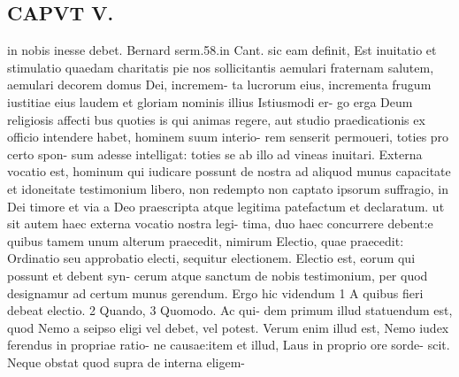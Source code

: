 \documentclass{article}
\begin{document}
\begin{pages}
\section*{CAPVT V. }
\marginpar{[ p.345 ]}in nobis inesse debet. Bernard serm.58.in Cant. sic eam definit, Est inuitatio et stimulatio quaedam charitatis pie nos sollicitantis aemulari fraternam salutem, aemulari decorem domus Dei, incremem- ta lucrorum eius, incrementa frugum iustitiae eius laudem et gloriam nominis illius Istiusmodi er- go erga Deum religiosis affecti bus quoties is qui animas regere, aut studio praedicationis ex officio intendere habet, hominem suum interio- rem senserit permoueri, toties pro certo spon- sum adesse intelligat: toties se ab illo ad vineas inuitari. Externa vocatio est, hominum qui iudicare possunt de nostra ad aliquod munus capacitate et idoneitate testimonium libero, non redempto non captato ipsorum suffragio, in Dei timore et via a Deo praescripta atque legitima patefactum et declaratum. ut sit autem haec externa vocatio nostra legi- tima, duo haec concurrere debent:e quibus tamem unum alterum praecedit, nimirum Electio, quae praecedit: Ordinatio seu approbatio electi, sequitur electionem. Electio est, eorum qui possunt et debent syn- cerum atque sanctum de nobis testimonium, per quod designamur ad certum munus gerendum. Ergo hic videndum 1 A quibus fieri debeat electio. 2 Quando, 3 Quomodo. Ac qui- dem primum illud statuendum est, quod Nemo a seipso eligi vel debet, vel potest. Verum enim illud est, Nemo iudex ferendus in propriae ratio- ne causae:item et illud, Laus in proprio ore sorde- scit. Neque obstat quod supra de interna eligem- 

\end{pages}
\end{document}
